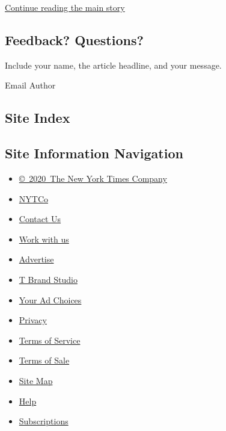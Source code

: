 \protect\hyperlink{after-mid2}{Continue reading the main story}

\hypertarget{feedback-questions}{%
\subsection{Feedback? Questions?}\label{feedback-questions}}

Include your name, the article headline, and your message.

Email Author

\hypertarget{site-index}{%
\subsection{Site Index}\label{site-index}}

\hypertarget{site-information-navigation}{%
\subsection{Site Information
Navigation}\label{site-information-navigation}}

\begin{itemize}
\tightlist
\item
  \href{https://help.nytimes.com/hc/en-us/articles/115014792127-Copyright-notice}{©~2020~The
  New York Times Company}
\end{itemize}

\begin{itemize}
\tightlist
\item
  \href{https://www.nytco.com/}{NYTCo}
\item
  \href{https://help.nytimes.com/hc/en-us/articles/115015385887-Contact-Us}{Contact
  Us}
\item
  \href{https://www.nytco.com/careers/}{Work with us}
\item
  \href{https://nytmediakit.com/}{Advertise}
\item
  \href{http://www.tbrandstudio.com/}{T Brand Studio}
\item
  \href{https://www.nytimes.com/privacy/cookie-policy\#how-do-i-manage-trackers}{Your
  Ad Choices}
\item
  \href{https://www.nytimes.com/privacy}{Privacy}
\item
  \href{https://help.nytimes.com/hc/en-us/articles/115014893428-Terms-of-service}{Terms
  of Service}
\item
  \href{https://help.nytimes.com/hc/en-us/articles/115014893968-Terms-of-sale}{Terms
  of Sale}
\item
  \href{https://spiderbites.nytimes.com}{Site Map}
\item
  \href{https://help.nytimes.com/hc/en-us}{Help}
\item
  \href{https://www.nytimes.com/subscription?campaignId=37WXW}{Subscriptions}
\end{itemize}

